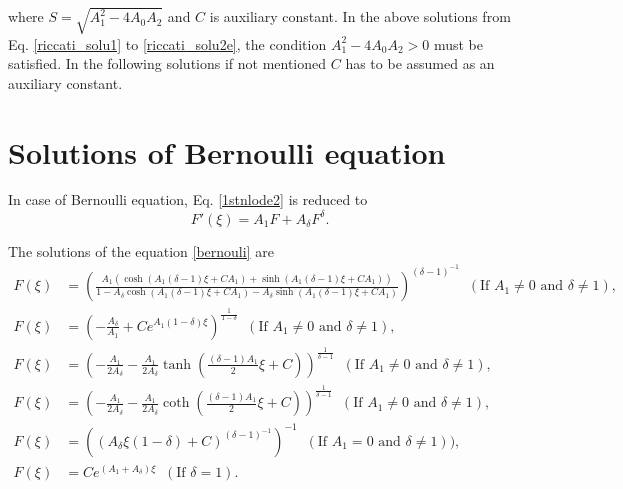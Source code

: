 \documentclass[prd,aps,floats,showkeys,nofootinbib,notitlepage]{revtex4-2}
\begin{document}
	where $S = \sqrt{A_1^2-4A_0A_2}$ and $C$ is auxiliary constant. In the above solutions from Eq. \eqref{riccati_solu1} to \eqref{riccati_solu2e}, the condition $A_1^2-4A_0A_2>0$ must be satisfied. In the following solutions if not mentioned $C$ has to be assumed as an auxiliary constant.
	
	\renewcommand{\theequation}{B-\arabic{equation}}
	\section{Solutions of Bernoulli equation}\label{sec:appenB}
	
	In case of Bernoulli equation, Eq. \eqref{1stnlode2} is reduced to
	\begin{equation}\label{bernouli}
		F'\left( \xi  \right) = {A_1}F + {A_\delta}F^{\delta}.
	\end{equation} 
	
	The solutions of the equation \eqref{bernouli} are \cite{yang}
	\begin{subequations}\label{bernouli_solu}
		\begin{align}
			F\left( \xi  \right) &= {\left( {\frac{{{A_1} \left( {\cosh \left( {{A_1}\left( {\delta - 1} \right) \xi + {C} {A_1}} \right) + \sinh \left( {{A_1} \left( {\delta - 1} \right)\xi + {C} {A_1}} \right)} \right)}}{{1 - {A_\delta} \cosh \left( {{A_1}\left( {\delta - 1} \right) \xi + {C} {A_1}} \right) - {A_\delta} \sinh \left( {{A_1}\left( {\delta - 1} \right) \xi + {C} {A_1}} \right)}}} \right)^{{{\left( {\delta - 1} \right)}^{ - 1}}}} \;\;(\text{If } A_1\neq 0\text{ and }\delta \neq 1),\\
			F\left( \xi  \right) &= {\left( { - \frac{{{A_\delta }}}{{{A_1}}} + C{e^{{A_1}(1 - \delta )\xi }}} \right)^{ \frac{1}{{1 - \delta }}}}\;\;(\text{If } A_1\neq 0\text{ and }\delta \neq 1), \\
			F\left( \xi  \right) &= {\left( { - \frac{{{A_1}}}{{2{A_\delta }}} - \frac{{{A_1}}}{{2{A_\delta }}}\tanh \left( {\frac{{(\delta  - 1){A_1}}}{2}\xi  + C} \right)} \right)^{\frac{1}{{\delta  - 1}}}}\;\;(\text{If } A_1\neq 0\text{ and }\delta \neq 1),\\
			F\left( \xi  \right) &= {\left( { - \frac{{{A_1}}}{{2{A_\delta }}} - \frac{{{A_1}}}{{2{A_\delta }}}\coth \left( {\frac{{(\delta  - 1){A_1}}}{2}\xi  + C} \right)} \right)^{\frac{1}{{\delta  - 1}}}}\;\;(\text{If } A_1\neq 0\text{ and }\delta \neq 1), \\ 
			F\left( \xi  \right) &= {\left( {{{\left( {{A_\delta} \xi(1 -  \delta) + {C}} \right)}^{{{\left( {\delta - 1} \right)}^{ - 1}}}}} \right)^{ - 1}} \;\;(\text{If } A_1=0 \text{ and } \delta \neq 1)),\\
			F\left( \xi  \right) &= C e^{({A_1} + {A_\delta })\xi }\;\; (\text{If }\delta = 1).
		\end{align}
	\end{subequations}
	
\end{document}
